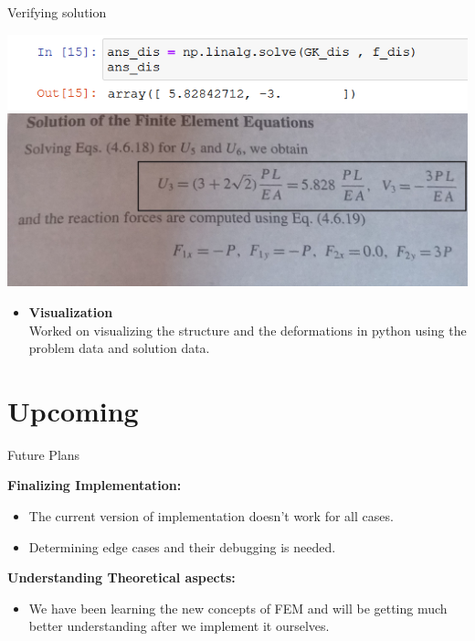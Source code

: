 \documentclass{beamer}
\begin{document}
\begin{frame}[t]{Verifying solution }
		\begin{center}
			\includegraphics[width=\linewidth]{ans1}
			\includegraphics[width=0.9\linewidth]{book}
		\end{center}
		
		\begin{itemize}
\item \textbf{Visualization}\\
Worked on visualizing the structure and the deformations in python using the problem data and solution data.\\
		
	\end{itemize}
\end{frame}


\section{Upcoming}
\begin{frame}{Future Plans}
	
	\textbf{Finalizing Implementation:}
	\begin{itemize}
		\item The current version of implementation doesn't work for all cases.
		\item Determining edge cases and their debugging is needed.
		
	\end{itemize}
	\vspace{10px}
	\textbf{Understanding Theoretical aspects:}
\begin{itemize}
	\item We have been learning the new concepts of FEM and will be getting much better understanding after we implement it ourselves.
	
\end{itemize}
\end{frame}
\end{document}
